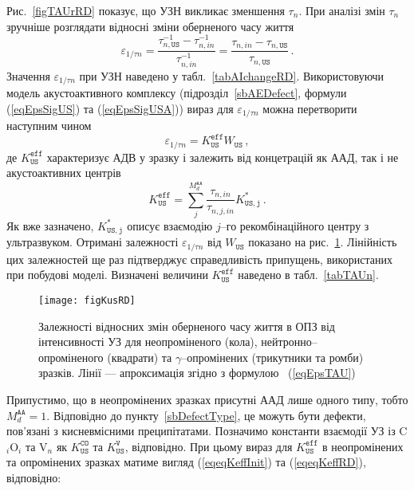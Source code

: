 Рис.~\ref{figTAUrRD} показує, що УЗН викликає зменшення $\tau_n$.
При аналізі змін $\tau_n$
зручніше розглядати відносні зміни оберненого часу життя
\begin{equation*}
  \varepsilon_{1/\tau n}=\frac{\tau_{n,\mathtt{US}}^{-1}-\tau_{n,in}^{-1}}{\tau_{n,in}^{-1}}=\frac{\tau_{n,in}-\tau_{n,\mathtt{US}}}{\tau_{n,\mathtt{US}}}\,.
\end{equation*}
Значення $\varepsilon_{1/\tau n}$ при УЗН наведено у табл.~\ref{tabAIchangeRD}.
Використовуючи модель акустоактивного комплексу (підрозділ~\ref{sbAEDefect}, формули (\ref{eqEpsSigUS}) та (\ref{eqEpsSigUSA}))
вираз для $\varepsilon_{1/\tau n}$ можна перетворити наступним чином
\begin{equation}
\label{eqEpsTAU}
\varepsilon_{1/\tau n}=K_\mathtt{US}^\mathtt{eff}W_\mathtt{US}\,,
\end{equation}
де
$K_\mathtt{US}^\mathtt{eff}$ характеризує АДВ у зразку і залежить від
концетрацій як ААД, так і не акустоактивних центрів
\begin{equation}
\label{eqKeff}
K_\mathtt{US}^\mathtt{eff}=\sum_j^{M_d^\mathtt{AA}}\frac{\tau_{n,in}}{\tau_{n,j,in}}K_\mathtt{US,j}^{*}\,.
\end{equation}
Як вже зазначено, $K_\mathtt{US,j}^*$ описує взаємодію $j$--го рекомбінаційного центру з ультразвуком.
Отримані залежності $\varepsilon_{1/\tau n}$ від $W_\mathtt{US}$ показано на рис.~\ref{figKusRD}.
Лінійність цих залежностей ще раз підтверджує справедливість припущень, використаних при побудові
моделі.
Визначені величини $K_\mathtt{US}^\mathtt{eff}$ наведено в табл.~\ref{tabTAUn}.


\begin{figure}
\center
\texttt{[image: figKusRD]}
\caption{\label{figKusRD}
Залежності відносних змін оберненого часу життя в ОПЗ від інтенсивності УЗ для
неопроміненого (кола), нейтронно--опроміненого (квадрати) та $\gamma$--опромінених (трикутники та ромби) зразків.
Лінії --- апроксимація згідно з формулою ~(\ref{eqEpsTAU})
}%
\end{figure}

Припустимо,
що в неопромінених зразках присутні ААД лише одного типу, тобто $M_d^\mathtt{AA}=1$.
Відповідно до пункту~\ref{sbDefectType}, це можуть бути дефекти, пов'язані з кисневмісними преципітатами.
Позначимо константи взаємодії УЗ із C$_i$O$_i$ та V$_n$ як $K_\mathtt{US}^\mathtt{CO}$ та $K_\mathtt{US}^\mathtt{V}$, відповідно.
При цьому вираз для $K_\mathtt{US}^\mathtt{eff}$ в неопромінених та опромінених зразках
матиме вигляд (\ref{eqeqKeffInit}) та (\ref{eqeqKeffRD}), відповідно:


